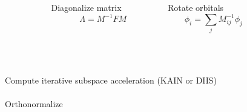 \documentclass[mathserif, 10pt]{beamer}
\begin{document}
\begin{frame}
{\begin{columns}
\begin{column}[b]{0.1\textwidth}
    \end{column}
    \begin{column}[b]{0.4\textwidth}
    \centering
    Diagonalize matrix
    \begin{equation}
	\nonumber
	\Lambda = M^{-1}FM
    \end{equation}
    \end{column}
    \begin{column}[b]{0.4\textwidth}
    \centering
    Rotate orbitals
    \begin{equation}
	\nonumber
	\phi_i = \sum_jM^{-1}_{ij}\phi_j
    \end{equation}
    \end{column}
    \begin{column}[b]{0.1\textwidth}
    \ \\
    \end{column}
    \end{columns}
    \ \\
    \ \\
    \pause
    Compute iterative subspace acceleration (KAIN or DIIS)\\
    \ \\
    Orthonormalize\\
    \ \\
    }
\end{frame}
\end{document}
